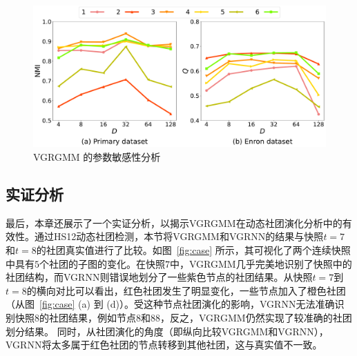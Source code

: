 \begin{figure}[htbp]
	\centering
	\includegraphics[width=.6\textwidth]{figures/chap06/DimensionsOndifferentData-t.pdf}
	\caption{VGRGMM 的参数敏感性分析}
	\label{fig:Hyper}
	\vspace{0cm}
\end{figure}




\subsection{实证分析}


最后，本章还展示了一个实证分析，以揭示VGRGMM在动态社团演化分析中的有效性。通过HS12动态社团检测，本节将VGRGMM和VGRNN的结果与快照$t=7$和$t=8$的社团真实值进行了比较。如图~\ref{fig:case} 所示，其可视化了两个连续快照中具有$5$个社团的子图的变化。在快照$7$中，VGRGMM几乎完美地识别了快照中的社团结构，而VGRNN则错误地划分了一些紫色节点的社团结果。从快照$t=7$到$t=8$的横向对比可以看出，红色社团发生了明显变化，一些节点加入了橙色社团（从图~\ref{fig:case} (a) 到 (d)）。受这种节点社团演化的影响，VGRNN无法准确识别快照$8$的社团结果，例如节点$8$和$88$，反之，VGRGMM仍然实现了较准确的社团划分结果。
同时，从社团演化的角度（即纵向比较VGRGMM和VGRNN），VGRNN将太多属于红色社团的节点转移到其他社团，这与真实值不一致。


